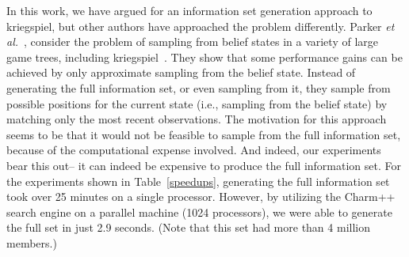 \documentclass[times, 10pt,twocolumn]{article}
\newcommand{\etal}{{\em et al.}\ }
\begin{document}
In this work, we have argued for an information set generation approach to kriegspiel, but other authors have approached
the problem differently.  Parker \etal, consider the problem of sampling from belief states in a variety of large game
trees, including kriegspiel~\cite{parker05game}.  They show that some performance gains can be achieved by only
approximate sampling from the belief state.  Instead of generating the full information set, or even sampling from it,
they sample from possible positions for the current state (i.e., sampling from the belief state) by matching only the
most recent observations.  The motivation for this approach seems to be that it would not be feasible to sample from
the full information set, because of the computational expense involved.  And indeed, our experiments bear this out-- it
can indeed be expensive to produce the full information set.  For the experiments shown in Table~\ref{speedups},
generating the full information set took over 25 minutes on a single processor.  However, by utilizing the Charm++
search engine on a parallel machine (1024 processors), we were able to generate the full set in just 2.9 seconds.  (Note
that this set had more than 4 million members.)  


\end{document}
